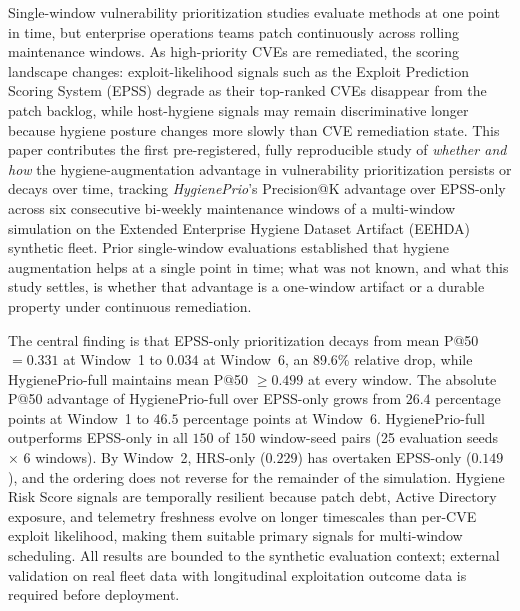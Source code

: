 Single-window vulnerability prioritization studies evaluate methods at one point in time, but enterprise operations teams patch continuously across rolling maintenance windows. As high-priority CVEs are remediated, the scoring landscape changes: exploit-likelihood signals such as the Exploit Prediction Scoring System (EPSS) degrade as their top-ranked CVEs disappear from the patch backlog, while host-hygiene signals may remain discriminative longer because hygiene posture changes more slowly than CVE remediation state. This paper contributes the first pre-registered, fully reproducible study of \textit{whether and how} the hygiene-augmentation advantage in vulnerability prioritization persists or decays over time, tracking \textit{HygienePrio}'s Precision@K advantage over EPSS-only across six consecutive bi-weekly maintenance windows of a multi-window simulation on the Extended Enterprise Hygiene Dataset Artifact (EEHDA) synthetic fleet. Prior single-window evaluations established that hygiene augmentation helps at a single point in time; what was not known, and what this study settles, is whether that advantage is a one-window artifact or a durable property under continuous remediation.

The central finding is that EPSS-only prioritization decays from mean P@50 $= 0.331$ at Window~1 to $0.034$ at Window~6, an 89.6\% relative drop, while HygienePrio-full maintains mean P@50 $\geq 0.499$ at every window. The absolute P@50 advantage of HygienePrio-full over EPSS-only grows from $26.4$ percentage points at Window~1 to $46.5$ percentage points at Window~6. HygienePrio-full outperforms EPSS-only in all $150$ of $150$ window-seed pairs (25 evaluation seeds $\times$ 6 windows). By Window~2, HRS-only ($0.229$) has overtaken EPSS-only ($0.149$), and the ordering does not reverse for the remainder of the simulation. Hygiene Risk Score signals are temporally resilient because patch debt, Active Directory exposure, and telemetry freshness evolve on longer timescales than per-CVE exploit likelihood, making them suitable primary signals for multi-window scheduling. All results are bounded to the synthetic evaluation context; external validation on real fleet data with longitudinal exploitation outcome data is required before deployment.
